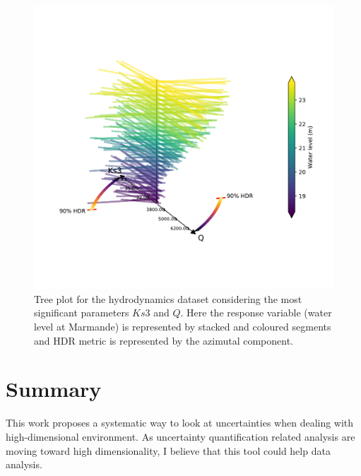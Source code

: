 
\begin{figure}[!ht]
\centering
\includegraphics[width=0.9\linewidth,keepaspectratio]{fig/contributions/visu/mascaret_tree.pdf}
\caption{Tree plot for the hydrodynamics dataset considering the most significant parameters $Ks3$ and $Q$. Here the response variable (water level at Marmande) is represented by stacked and coloured segments and HDR metric is represented by the azimutal component.}
\label{fig:tree}
\end{figure}


\section{Summary}\label{sec:visu_ccl}

This work proposes a systematic way to look at uncertainties when dealing with high-dimensional environment. As uncertainty quantification related analysis are moving toward high dimensionality, I believe that this tool could help data analysis.

